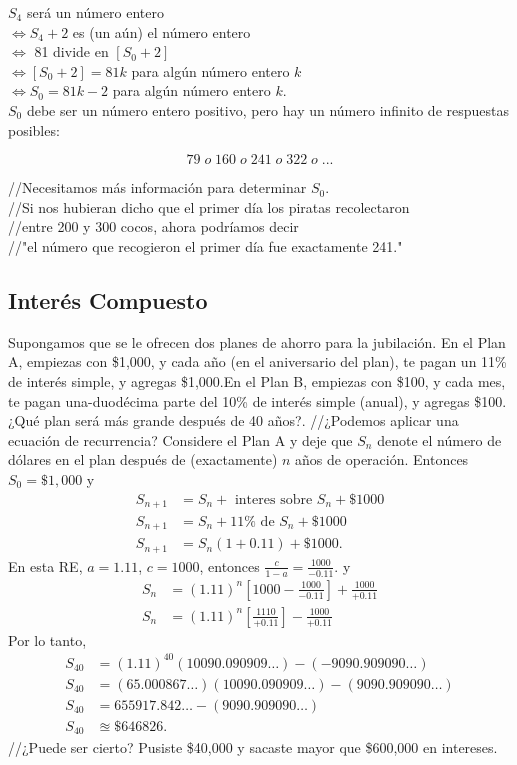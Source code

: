 $S_4$ será un número entero\\
$\Leftrightarrow S_{4} + 2$ es (un aún) el número entero\\
$\Leftrightarrow$ 81 divide en $[S_0 + 2]$\\
$\Leftrightarrow [S_0 + 2] = 81k$ para algún número entero $k$\\
$\Leftrightarrow S_0 = 81k - 2$ para algún número entero $k$.\\

$S_{0}$ debe ser un número entero positivo, pero hay un número infinito de respuestas posibles:

$$79\; o \;160 \; o \; 241\; o \; 322 \; o\; ...$$

//Necesitamos más información para determinar $S_0$.\\
//Si nos hubieran dicho que el primer día los piratas recolectaron\\
//entre 200 y 300 cocos, ahora podríamos decir\\
//"el número que recogieron el primer día fue exactamente 241."


\subsection{Interés Compuesto}

Supongamos que se le ofrecen dos planes de ahorro para la jubilación. En el Plan A, empiezas con \$1,000, y cada año (en el aniversario del plan), te pagan un 11\% de interés simple, y agregas \$1,000.En el Plan B, empiezas con \$100, y cada mes, te pagan una-duodécima parte del 10\% de interés simple (anual), y agregas \$100.¿Qué plan será más grande después de 40 años?.
//¿Podemos aplicar una ecuación de recurrencia?
Considere el Plan A y deje que $S_n$ denote el número de dólares en el plan después de (exactamente) $n$ años de operación. Entonces $S_0=\$1,000$ y
\begin{align*}
S_{n+1}
&= S_{n}+\text{ interes sobre }S_n+\$1000\\
S_{n+1}
&=S_{n}+11\%\text{ de }S_n+\$1000\\
S_{n+1}
&=S_{n}(1+0.11)+\$1000.
\end{align*}
En esta RE, $a=1.11$, $c=1000$, entonces $\frac{c}{1-a}=\frac{1000}{-0.11}$. y
\begin{align*}
S_{n}
&=(1.11)^{n}\left[1000-\frac{1000}{-0.11}\right]+\frac{1000}{+0.11}\\
S_{n}
&=(1.11)^{n}\left[\frac{1110}{+0.11}\right]-\frac{1000}{+0.11}
\end{align*}
Por lo tanto,
\begin{align*}
S_{40}
&=(1.11)^{40}(10090.090909\ldots)-(-9090.909090\ldots)\\
S_{40}
&=(65.000867\ldots)(10090.090909\ldots)-(9090.909090\ldots)\\
S_{40}
&=655917.842\ldots-(9090.909090\ldots)\\
S_{40}
&\approxeq\$646826.
\end{align*}
//¿Puede ser cierto? Pusiste \$40,000 y sacaste mayor que \$600,000 en intereses.


